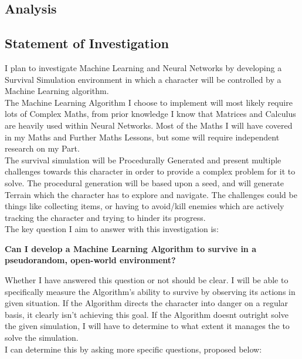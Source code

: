 \begin{flushleft}
    \section{Analysis}
        \subsection{Statement of Investigation}
            \large
            \vspace{0.2cm}
            I plan to investigate Machine Learning and Neural Networks by developing a Survival Simulation environment 
            in which a character will be controlled by a Machine Learning algorithm. \\
            \vspace{0.2cm}
            The Machine Learning Algorithm I choose to implement will most likely require lots of Complex Maths, from prior knowledge
            I know that Matrices and Calculus are heavily used within Neural Networks. Most of the Maths I will have 
            covered in my Maths and Further Maths Lessons, but some will require independent research on my Part. \\
            \vspace{0.2cm}
            The survival simulation will be Procedurally Generated and present multiple challenges 
            towards this character in order to provide a complex problem for it to solve. The procedural generation will
            be based upon a seed, and will generate Terrain which the character has to explore and navigate. The challenges 
            could be things like collecting items, or having to avoid/kill enemies which are actively tracking the character 
            and trying to hinder its progress. \\
            \vspace{0.2cm}
            The key question I aim to answer with this investigation is:

            \begin{center}
                \vspace{0.3cm}
                \textbf{Can I develop a Machine Learning Algorithm to survive in a pseudorandom, open-world environment?}
                \vspace{0.3cm}
            \end{center}

            Whether I have answered this question or not should be clear. I will be able to specifically measure the Algorithm's ability 
            to survive by observing its actions in given situation. If the Algorithm directs the character into danger
            on a regular basis, it clearly isn't achieving this goal. If the Algorithm doesnt outright solve the given simulation, 
            I will have to determine to what extent it manages the to solve the simulation. \\
            \vspace{0.2cm}
            I can determine this by asking more specific questions, proposed below: \\


\end{flushleft}
